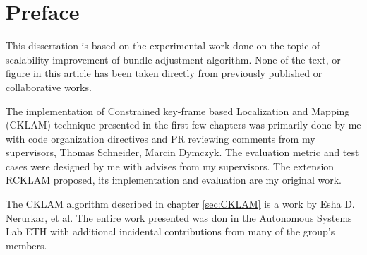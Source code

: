 \chapter*{Preface}

This dissertation is based on the experimental work done on the topic of scalability improvement of bundle adjustment algorithm. None of the text, or figure in this article has been  taken directly from previously published or collaborative works.

The implementation of Constrained key-frame based Localization and Mapping (CKLAM) technique presented in the first few chapters was primarily done by me with code organization directives and PR reviewing comments from my supervisors, Thomas Schneider, Marcin Dymczyk. The evaluation metric and test cases were designed by me with advises from my supervisors. The extension RCKLAM proposed, its implementation and evaluation are my original work.

The CKLAM algorithm described in chapter \ref{sec:CKLAM} is a work by Esha D. Nerurkar, et al. The entire work presented was don in the Autonomous Systems Lab ETH with additional incidental contributions from many of the group’s members.